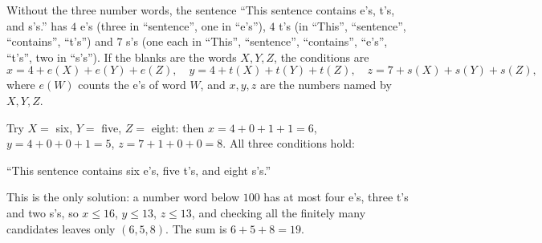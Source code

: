 Without the three number words, the sentence ``This sentence contains e's, t's, and s's.'' has $4$ e's (three in ``sentence'', one in ``e's''), $4$ t's (in ``This'', ``sentence'', ``contains'', ``t's'') and $7$ s's (one each in ``This'', ``sentence'', ``contains'', ``e's'', ``t's'', two in ``s's''). If the blanks are the words $X,Y,Z$, the conditions are
\[
x=4+e(X)+e(Y)+e(Z),\quad y=4+t(X)+t(Y)+t(Z),\quad z=7+s(X)+s(Y)+s(Z),
\]
where $e(W)$ counts the e's of word $W$, and $x,y,z$ are the numbers named by $X,Y,Z$.

Try $X=$ six, $Y=$ five, $Z=$ eight: then $x=4+0+1+1=6$, $y=4+0+0+1=5$, $z=7+1+0+0=8$. All three conditions hold:
\begin{center}
``This sentence contains six e's, five t's, and eight s's.''
\end{center}
This is the only solution: a number word below $100$ has at most four e's, three t's and two s's, so $x\le16$, $y\le13$, $z\le13$, and checking all the finitely many candidates leaves only $(6,5,8)$. The sum is $6+5+8=\boxed{19}$.
